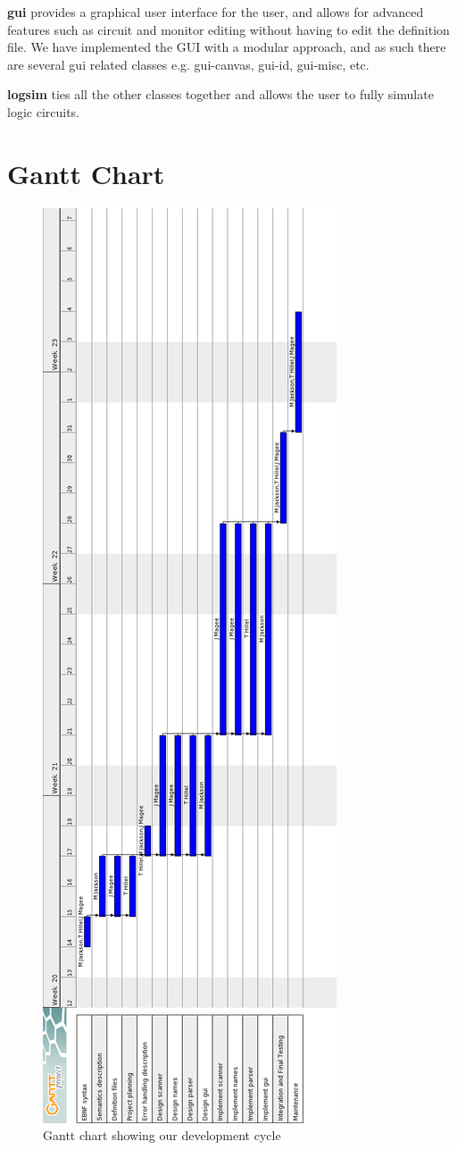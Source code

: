 \documentclass[a4paper,10pt]{article}
\begin{document}
\textbf{gui} provides a graphical user interface for the user, and allows for advanced features such as circuit and monitor editing without having to edit the definition file. We have implemented the GUI with a modular approach, and as such there are several gui related classes e.g. gui-canvas, gui-id, gui-misc, etc.

\textbf{logsim} ties all the other classes together and allows the user to fully simulate logic circuits.

\pagebreak

\section{Gantt Chart}
\label{sec:gantt}

\begin{figure}[h]
 \centering
  \includegraphics[height=.75\textheight]{../../report1/Gantt-Chart.png}
 \caption{Gantt chart showing our development cycle}
 \label{fig:ganttchart}
\end{figure}
\pagebreak
\end{document}
